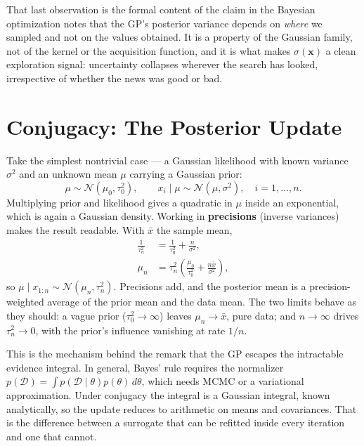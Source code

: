 \documentclass[conference]{IEEEtran}
\begin{document}
That last observation is the formal content of the claim in the Bayesian optimization notes that the GP's posterior variance depends on \textit{where} we sampled and not on the values obtained. It is a property of the Gaussian family, not of the kernel or the acquisition function, and it is what makes $\sigma(\mathbf{x})$ a clean exploration signal: uncertainty collapses wherever the search has looked, irrespective of whether the news was good or bad.

\section*{Conjugacy: The Posterior Update}
Take the simplest nontrivial case --- a Gaussian likelihood with known variance $\sigma^2$ and an unknown mean $\mu$ carrying a Gaussian prior:
\begin{equation}
    \mu \sim \mathcal{N}(\mu_0, \tau_0^2),
    \qquad
    x_i \mid \mu \sim \mathcal{N}(\mu, \sigma^2), \quad i = 1,\dots,n.
\end{equation}
Multiplying prior and likelihood gives a quadratic in $\mu$ inside an exponential, which is again a Gaussian density. Working in \textbf{precisions} (inverse variances) makes the result readable. With $\bar{x}$ the sample mean,
\begin{align}
    \frac{1}{\tau_n^2} &= \frac{1}{\tau_0^2} + \frac{n}{\sigma^2}, \\
    \mu_n &= \tau_n^2\left(\frac{\mu_0}{\tau_0^2} + \frac{n\bar{x}}{\sigma^2}\right),
\end{align}
so $\mu \mid x_{1:n} \sim \mathcal{N}(\mu_n, \tau_n^2)$. Precisions add, and the posterior mean is a precision-weighted average of the prior mean and the data mean. The two limits behave as they should: a vague prior ($\tau_0^2 \to \infty$) leaves $\mu_n \to \bar{x}$, pure data; and $n \to \infty$ drives $\tau_n^2 \to 0$, with the prior's influence vanishing at rate $1/n$.

This is the mechanism behind the remark that the GP escapes the intractable evidence integral. In general, Bayes' rule requires the normalizer $p(\mathcal{D}) = \int p(\mathcal{D}\mid\theta)p(\theta)\,d\theta$, which needs MCMC or a variational approximation. Under conjugacy the integral is a Gaussian integral, known analytically, so the update reduces to arithmetic on means and covariances. That is the difference between a surrogate that can be refitted inside every iteration and one that cannot.
\end{document}
